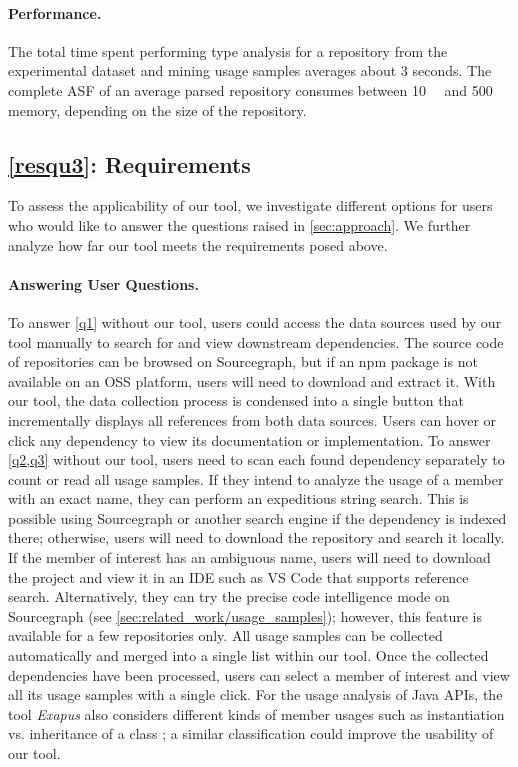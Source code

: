 \documentclass[a4paper,twoside]{article}
\begin{document}
\paragraph{Performance.}
%
The total time spent performing type analysis for a repository from the experimental dataset and mining usage samples averages about \num{3} seconds.
The complete ASF of an average parsed repository consumes between \SI{10}{\mega\byte} and \SI{500}{\mega\byte} memory, depending on the size of the repository.



\subsection{\ref{resqu3}: Requirements}
\label{sec:evaluation/resqu3}
%
To assess the applicability of our tool, we investigate different options for users who would like to answer the questions raised in \cref{sec:approach}.
We further analyze how far our tool meets the requirements posed above.


\paragraph{Answering User Questions.}
%
To answer \cref{q1} without our tool, users could access the data sources used by our tool manually to search for and view downstream dependencies.
The source code of repositories can be browsed on Sourcegraph, but if an npm package is not available on an OSS platform, users will need to download and extract it.
With our tool, the data collection process is condensed into a single button that incrementally displays all references from both data sources.
Users can hover or click any dependency to view its documentation or implementation.
%
To answer \cref{q2,q3} without our tool, users need to scan each found dependency separately to count or read all usage samples.
If they intend to analyze the usage of a member with an exact name, they can perform an expeditious string search.
This is possible using Sourcegraph or another search engine if the dependency is indexed there; otherwise, users will need to download the repository and search it locally.
If the member of interest has an ambiguous name, users will need to download the project and view it in an IDE such as VS Code that supports reference search.
Alternatively, they can try the precise code intelligence mode on Sourcegraph (see \cref{sec:related_work/usage_samples}); however, this feature is available for a few repositories only.
%
All usage samples can be collected automatically and merged into a single list within our tool.
Once the collected dependencies have been processed, users can select a member of interest and view all its usage samples with a single click.
For the usage analysis of Java APIs, the tool \emph{Exapus} also considers different kinds of member usages such as instantiation vs. inheritance of a class \cite{de2013multi}; a similar classification could improve the usability of our tool.
\end{document}
